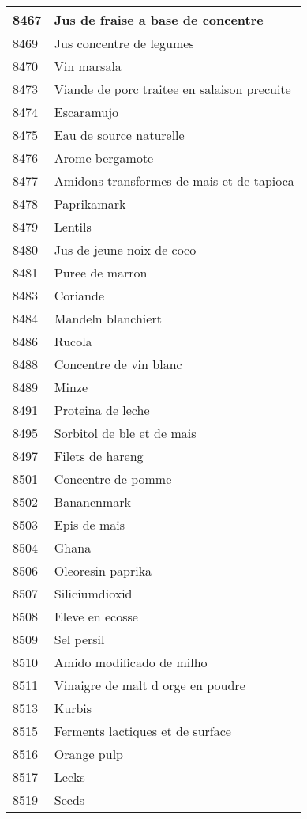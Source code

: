 \begin{longtable}{|l|l|}
8467 & Jus de fraise a base de concentre \\ \hline 
8469 & Jus concentre de legumes \\ \hline 
8470 & Vin marsala \\ \hline 
8473 & Viande de porc traitee en salaison precuite \\ \hline 
8474 & Escaramujo \\ \hline 
8475 & Eau de source naturelle \\ \hline 
8476 & Arome bergamote \\ \hline 
8477 & Amidons transformes de mais et de tapioca \\ \hline 
8478 & Paprikamark \\ \hline 
8479 & Lentils \\ \hline 
8480 & Jus de jeune noix de coco \\ \hline 
8481 & Puree de marron \\ \hline 
8483 & Coriande \\ \hline 
8484 & Mandeln blanchiert \\ \hline 
8486 & Rucola \\ \hline 
8488 & Concentre de vin blanc \\ \hline 
8489 & Minze \\ \hline 
8491 & Proteina de leche \\ \hline 
8495 & Sorbitol de ble et de mais \\ \hline 
8497 & Filets de hareng \\ \hline 
8501 & Concentre de pomme \\ \hline 
8502 & Bananenmark \\ \hline 
8503 & Epis de mais \\ \hline 
8504 & Ghana \\ \hline 
8506 & Oleoresin paprika \\ \hline 
8507 & Siliciumdioxid \\ \hline 
8508 & Eleve en ecosse \\ \hline 
8509 & Sel persil \\ \hline 
8510 & Amido modificado de milho \\ \hline 
8511 & Vinaigre de malt d orge en poudre \\ \hline 
8513 & Kurbis \\ \hline 
8515 & Ferments lactiques et de surface \\ \hline 
8516 & Orange pulp \\ \hline 
8517 & Leeks \\ \hline 
8519 & Seeds \\ \hline 

\end{longtable}
